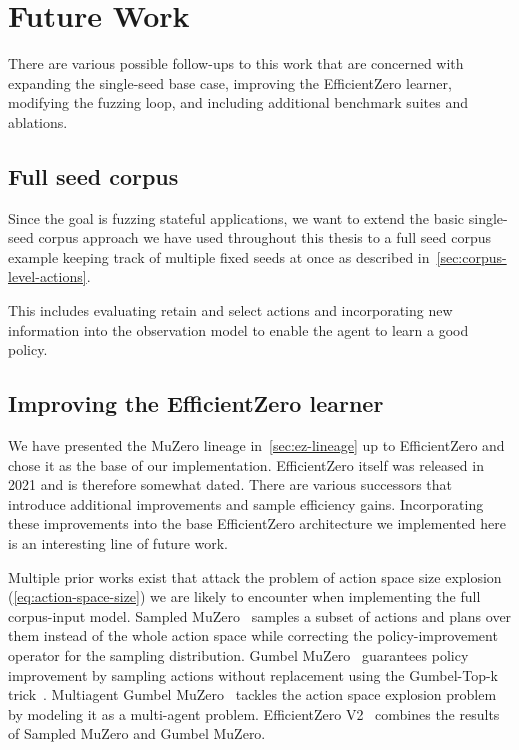 
\chapter{Future Work}\label{chap:future-work}

There are various possible follow-ups to this work that are concerned with expanding
the single-seed base case, improving the EfficientZero learner, modifying the fuzzing
loop, and including additional benchmark suites and ablations.

\section{Full seed corpus}

Since the goal is fuzzing stateful applications, we want to extend the basic
single-seed corpus approach we have used throughout this thesis to a full seed
corpus example keeping track of multiple fixed seeds at once as described
in~\cref{sec:corpus-level-actions}.

This includes evaluating retain and select actions and incorporating new
information into the observation model to enable the agent to learn a good
policy.

\section{Improving the EfficientZero learner}

We have presented the MuZero lineage in~\cref{sec:ez-lineage} up to EfficientZero
and chose it as the base of our implementation.
EfficientZero itself was released in 2021 and is therefore somewhat dated.
There are various successors that introduce additional improvements and sample efficiency
gains.
Incorporating these improvements into the base EfficientZero architecture we
implemented here is an interesting line of future work.

Multiple prior works exist that attack the problem of action space size explosion (\cref{eq:action-space-size})
we are likely to encounter when implementing the full corpus-input model.
Sampled MuZero~\cite{hubert_learning_2021} samples a subset of actions and plans over them
instead of the whole action space while correcting the policy-improvement operator for the sampling distribution.
Gumbel MuZero~\cite{danihelka_policy_2022} guarantees policy improvement by sampling
actions without replacement using the Gumbel-Top-k trick~\cite{kool_stochastic_2019}.
Multiagent Gumbel MuZero~\cite{hao_multiagent_2024} tackles the action space explosion
problem by modeling it as a multi-agent problem.
EfficientZero V2~\cite{wang_efficientzero_2024} combines the results of Sampled
MuZero and Gumbel MuZero.


